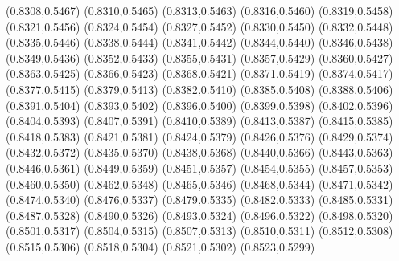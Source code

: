 \PST@Filltriangle(0.8308,0.5467)
\PST@Filltriangle(0.8310,0.5465)
\PST@Filltriangle(0.8313,0.5463)
\PST@Filltriangle(0.8316,0.5460)
\PST@Filltriangle(0.8319,0.5458)
\PST@Filltriangle(0.8321,0.5456)
\PST@Filltriangle(0.8324,0.5454)
\PST@Filltriangle(0.8327,0.5452)
\PST@Filltriangle(0.8330,0.5450)
\PST@Filltriangle(0.8332,0.5448)
\PST@Filltriangle(0.8335,0.5446)
\PST@Filltriangle(0.8338,0.5444)
\PST@Filltriangle(0.8341,0.5442)
\PST@Filltriangle(0.8344,0.5440)
\PST@Filltriangle(0.8346,0.5438)
\PST@Filltriangle(0.8349,0.5436)
\PST@Filltriangle(0.8352,0.5433)
\PST@Filltriangle(0.8355,0.5431)
\PST@Filltriangle(0.8357,0.5429)
\PST@Filltriangle(0.8360,0.5427)
\PST@Filltriangle(0.8363,0.5425)
\PST@Filltriangle(0.8366,0.5423)
\PST@Filltriangle(0.8368,0.5421)
\PST@Filltriangle(0.8371,0.5419)
\PST@Filltriangle(0.8374,0.5417)
\PST@Filltriangle(0.8377,0.5415)
\PST@Filltriangle(0.8379,0.5413)
\PST@Filltriangle(0.8382,0.5410)
\PST@Filltriangle(0.8385,0.5408)
\PST@Filltriangle(0.8388,0.5406)
\PST@Filltriangle(0.8391,0.5404)
\PST@Filltriangle(0.8393,0.5402)
\PST@Filltriangle(0.8396,0.5400)
\PST@Filltriangle(0.8399,0.5398)
\PST@Filltriangle(0.8402,0.5396)
\PST@Filltriangle(0.8404,0.5393)
\PST@Filltriangle(0.8407,0.5391)
\PST@Filltriangle(0.8410,0.5389)
\PST@Filltriangle(0.8413,0.5387)
\PST@Filltriangle(0.8415,0.5385)
\PST@Filltriangle(0.8418,0.5383)
\PST@Filltriangle(0.8421,0.5381)
\PST@Filltriangle(0.8424,0.5379)
\PST@Filltriangle(0.8426,0.5376)
\PST@Filltriangle(0.8429,0.5374)
\PST@Filltriangle(0.8432,0.5372)
\PST@Filltriangle(0.8435,0.5370)
\PST@Filltriangle(0.8438,0.5368)
\PST@Filltriangle(0.8440,0.5366)
\PST@Filltriangle(0.8443,0.5363)
\PST@Filltriangle(0.8446,0.5361)
\PST@Filltriangle(0.8449,0.5359)
\PST@Filltriangle(0.8451,0.5357)
\PST@Filltriangle(0.8454,0.5355)
\PST@Filltriangle(0.8457,0.5353)
\PST@Filltriangle(0.8460,0.5350)
\PST@Filltriangle(0.8462,0.5348)
\PST@Filltriangle(0.8465,0.5346)
\PST@Filltriangle(0.8468,0.5344)
\PST@Filltriangle(0.8471,0.5342)
\PST@Filltriangle(0.8474,0.5340)
\PST@Filltriangle(0.8476,0.5337)
\PST@Filltriangle(0.8479,0.5335)
\PST@Filltriangle(0.8482,0.5333)
\PST@Filltriangle(0.8485,0.5331)
\PST@Filltriangle(0.8487,0.5328)
\PST@Filltriangle(0.8490,0.5326)
\PST@Filltriangle(0.8493,0.5324)
\PST@Filltriangle(0.8496,0.5322)
\PST@Filltriangle(0.8498,0.5320)
\PST@Filltriangle(0.8501,0.5317)
\PST@Filltriangle(0.8504,0.5315)
\PST@Filltriangle(0.8507,0.5313)
\PST@Filltriangle(0.8510,0.5311)
\PST@Filltriangle(0.8512,0.5308)
\PST@Filltriangle(0.8515,0.5306)
\PST@Filltriangle(0.8518,0.5304)
\PST@Filltriangle(0.8521,0.5302)
\PST@Filltriangle(0.8523,0.5299)

